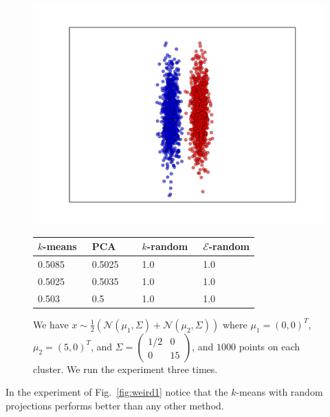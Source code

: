 \documentclass[aps,preprint,nofootinbib,floatfix]{revtex4-1}
\begin{document}
\begin{figure}
\begin{minipage}{.49\textwidth}
\includegraphics[scale=.45]{2d_cigar.pdf}
\end{minipage}
\begin{minipage}{.49\textwidth}
\begin{tabular}{ l l l l}
\hline
$k$-means~ & PCA~~~ & $k$-random~ & $\mathcal{E}$-random \\
\hline
0.5085 &
0.5025 &
1.0 &
1.0 \\
%
0.5025 &
0.5035 &
1.0 &
1.0 \\
%
0.503 &
0.5 &
1.0 &
1.0 \\
%
\hline
\end{tabular}
\end{minipage}
\caption{\label{fig:cigar}
We have $x \sim \tfrac{1}{2}\left( \mathcal{N}(\mu_1, \Sigma) +
\mathcal{N}(\mu_2, \Sigma)\right)$ where $\mu_1 = (0,0)^T$, $\mu_2=(5,0)^T$,
and $\Sigma = \left( \begin{smallmatrix} 1/2 & 0 \\ 0 & 15 \end{smallmatrix}
\right)$,
and $1000$ points on each cluster. We run the experiment three times.
}
\end{figure}

In the experiment of Fig.~\ref{fig:weird1} notice that the $k$-means with
random projections performs better than any other method.
\end{document}
